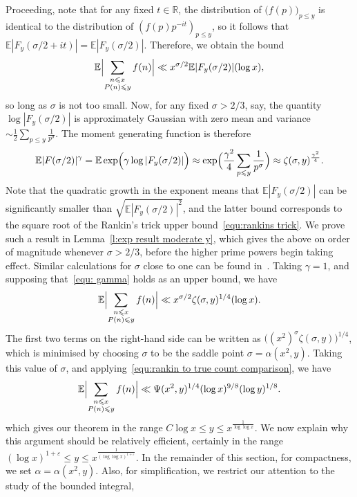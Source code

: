 \documentclass[12pt,a4paper,reqno]{amsart}
\numberwithin{equation}{section}
\def\R{\mathbb R}
\def\E{\mathbb E}
\def\leq {\leqslant}
\theoremstyle{remark}
\theoremstyle{definition}
\numberwithin{equation}{section}
\theoremstyle{remark}
\def\E{\mathbb E}
\begin{document}
Proceeding, note that for any fixed $t \in \R$, the distribution of $\bigl( f(p) \bigr)_{p \leq y}$ is identical to the distribution of $( f(p) p^{-it} )_{p \leq y}$, so it follows that $\E |F_y (\sigma / 2 + it)| = \E | F_y (\sigma/2)|$. Therefore, we obtain the bound
\[
\E \Bigl| \sum_{\substack{n \leq x \\ P(n) \leq y}} f(n) \Bigr| \ll x^{\sigma/2} \E |F_y (\sigma/2)| (\log x) ,
\]
so long as $\sigma$ is not too small. Now, for any fixed $\sigma > 2/3$, say, the quantity $\log |F_y (\sigma / 2)|$ is approximately Gaussian with zero mean and variance $\sim \frac{1}{2} \sum_{p \leq y} \frac{1}{p^{\sigma}}$. The moment generating function is therefore
\begin{equation}\label{equ: gamma}
 \E |F(\sigma / 2 )|^\gamma = \E \exp \Bigl( \gamma \log | F_y (\sigma / 2 ) | \Bigr) \approx \exp \Bigl( \frac{\gamma^2}{4} \sum_{p \leq y} \frac{1}{p^{\sigma}} \Bigr) \approx \zeta (\sigma, y)^{\frac{\gamma^2}{4}}.   
\end{equation}
Note that the quadratic growth in the exponent means that $\E |F_y (\sigma/2)|$ can be significantly smaller than $\sqrt{\E |F_y (\sigma/2)|^2}$, and the latter bound corresponds to the square root of the Rankin's trick upper bound~\eqref{equ:rankins trick}. We prove such a result in Lemma~\ref{l:exp result moderate y}, which gives the above on order of magnitude whenever $\sigma > 2/3$, before the higher prime powers begin taking effect. Similar calculations for $\sigma$ close to one can be found in~\cite[Euler Product Result 1]{Harperhigh}. Taking $\gamma = 1$, and supposing that~\eqref{equ: gamma} holds as an upper bound, we have
\[
\E \Bigl| \sum_{\substack{n \leq x \\ P(n) \leq y}} f(n) \Bigr| \ll x^{\sigma/2} \zeta(\sigma, y)^{1/4} (\log x) . 
\]
The first two terms on the right-hand side can be written as $\bigl( (x^2)^{\sigma} \zeta(\sigma,y) \bigr)^{1/4}$, which is minimised by choosing $\sigma$ to be the saddle point $\sigma = \alpha (x^2,y)$. Taking this value of $\sigma$, and applying~\eqref{equ:rankin to true count comparison}, we have
\[
\E \Bigl| \sum_{\substack{n \leq x \\ P(n) \leq y}} f(n) \Bigr| \ll \Psi(x^2, y)^{1/4} (\log x)^{9/8} (\log y)^{1/8}.
\]
which gives our theorem in the range $C \log x \leq y \leq x^{\frac{1}{\log \log x}}$. We now explain why this argument should be relatively efficient, certainly in the range $(\log x)^{1 + \varepsilon} \leq y \leq x^{\frac{1}{(\log \log x)^{1 + \varepsilon}}}$. In the remainder of this section, for compactness, we set $\alpha = \alpha (x^2,y)$. Also, for simplification, we restrict our attention to the study of the bounded integral,
\end{document}
